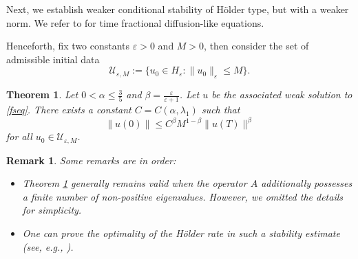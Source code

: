 \documentclass[reqno]{amsart}
\newtheorem{theorem}{Theorem}[section]
\newtheorem{rmk}{Remark}
\numberwithin{equation}{section}
\begin{document}
Next, we establish weaker conditional stability of H\"older type, but with a weaker norm. We refer to \cite[Theorem 1.4]{Ch24} for time fractional diffusion-like equations.

Henceforth, fix two constants $\varepsilon>0$ and $M>0$, then consider the set of admissible initial data
\begin{equation}\label{uad}
\mathcal{U}_{\varepsilon,M}:=\{u_0\in H_\varepsilon \colon \|u_0\|_{\varepsilon} \le M\}.
\end{equation}

\begin{theorem}\label{thmhstab}
Let $0<\alpha \le \frac{3}{5}$ and $\beta =\frac{\varepsilon}{\varepsilon + 1}$. Let $u$ be the associated weak solution to \eqref{fseq}. There exists a constant $C=C(\alpha,\lambda_{1})$ such that
\begin{equation}\label{eqthmhstab}
    \|u(0)\| \le C^{\beta} M^{1-\beta} \|u(T)\|^{\beta}
\end{equation}
for all $u_0\in \mathcal{U}_{\varepsilon,M}$.
\end{theorem}

\begin{rmk} Some remarks are in order: 
\begin{itemize}
    \item Theorem \ref{thmhstab} generally remains valid when the operator $A$ additionally possesses a finite number of non-positive eigenvalues. However, we omitted the details for simplicity.
    \item One can prove the optimality of the Hölder rate in such a stability estimate (see, e.g., \cite[Remark 2]{Hao19}).
\end{itemize}
\end{rmk}
\end{document}
